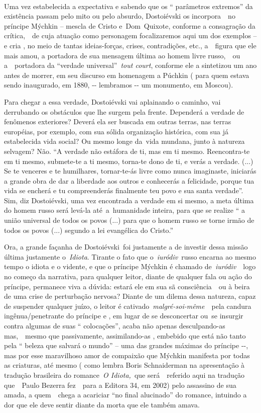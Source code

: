 ~

Uma vez estabelecida a expectativa e sabendo que os `` parâmetros
extremos'' da existência passam pelo mito ou pelo absurdo, Dostoiévski
os incorpora~~no príncipe Mýchkin -- mescla de Cristo e~Dom~Quixote,
conforme a consagração da crítica,~~de cuja atuação como personagem
focalizaremos aqui um dos exemplos -- e cria , no meio de tantas
ideias-forças, crises, contradições, etc., a~~figura que ele mais amou,
a portadora de sua mensagem última ao homem livre russo,~~ou
a~~portadora da ``verdade universal''~\emph{tout court}, conforme ele a
sintetizou um ano antes de morrer, em seu discurso em homenagem a
Púchkin ( para quem estava sendo inaugurado, em 1880, -\/- lembramos
-\/- um monumento, em Moscou).

Para chegar a essa verdade, Dostoiévski vai aplainando o caminho, vai
derrubando os obstáculos que lhe surgem pela frente. Dependerá a verdade
de fenômenos exteriores? Deverá ela ser buscada em outras terras, nas
terras européias, por exemplo, com sua sólida organização histórica, com
sua já estabelecida vida social? Ou mesmo longe da~vida mundana, junto à
natureza selvagem? Não. ``A verdade não estáfora de ti, mas em ti mesmo.
Reencontra-te em ti mesmo, submete-te a ti mesmo, torna-te dono de ti, e
verás a verdade. (...) Se te venceres e te humilhares, tornar-te-ás
livre como nunca imaginaste, iniciarás a grande obra de dar a liberdade
aos outros e conhecerás a felicidade, porque tua vida se encherá e tu
compreenderás finalmente teu povo e sua santa verdade''. Sim, diz
Dostoiévski, uma vez encontrada a verdade em si mesmo, a meta última do
homem russo será levá-la até~a~humanidade inteira, para que se realize
`` a união universal de todos os povos (...) para que o homem russo se
torne irmão de todos os povos (...) segundo a lei evangélica do
Cristo.''

Ora, a grande façanha de Dostoiévski~foi justamente a de investir dessa
missão última justamente o~\emph{Idiota}. Tirante o fato que
o\emph{~iuródiv}~russo encarna ao mesmo tempo o idiota e o vidente, e
que o príncipe Mýchkin é chamado de\emph{~iuródiv}~~logo no começo da
narrativa, para qualquer leitor, diante de qualquer fala ou ação do
príncipe, permanece viva a dúvida: estará ele em sua sã consciência~~ou
à beira de uma crise de perturbação nervosa? Diante de um dilema dessa
natureza, capaz de suspender qualquer juízo, o leitor é
cativado~\emph{malgré-soi-même}~~pela candura ingênua/penetrante do
príncipe e , em lugar de se desconcertar ou~se insurgir contra algumas
de suas `` colocações'', acaba não apenas desculpando-as mas,~~mesmo que
passivamente, assimilando-as , embebido que está não tanto pela ``
beleza que salvará o mundo'' -- uma das grandes máximas do príncipe
-\/-, mas por esse maravilhoso amor de compaixão que Mýchkin manifesta
por todas as criaturas, até mesmo ( como lembra Boris Schnaiderman na
apresentação à tradução brasileira do romance~\emph{O Idiota,}~que
será~~referido aqui na tradução que~~Paulo Bezerra fez~~para a Editora
34, em 2002) pelo assassino de sua amada, a quem~~chega a acariciar ``no
final alucinado'' do romance, intuindo a dor que ele deve sentir diante
da morta que ele também amava.

